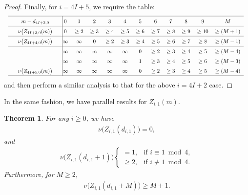 \documentclass[12pt,reqno]{amsart}
\numberwithin{equation}{section}
\theoremstyle{theorem}
\newtheorem{theorem}{Theorem}
\theoremstyle{definition}
\begin{document}
\begin{proof}
	Finally, for $i=4I+5$, we require the table:
	\begin{align*}
		\renewcommand\arraystretch{1.5}
		\scalebox{0.8}{%
			\begin{tabular*}{1.25\textwidth}{p{0pt}cp{0pt}|@{\extracolsep{\fill}}ccccccccccc}
				\hline
				& $m-d_{4I+3,0}$ && $0$ & $1$ & $2$ & $3$ & $4$ & $5$ & $6$ & $7$ & $8$ & $9$ & $M$\\
				\hline
				& $\nu\big(Z_{4I+3,0}(m)\big)$ && $0$ & $\ge 2$ & $\ge 3$ & $\ge 4$ & $\ge 5$ & $\ge 6$ & $\ge 7$ & $\ge 8$ & $\ge 9$ & $\ge 10$ & $\ge (M+1)$\\
				\hline
				& $\nu\big(Z_{4I+4,0}(m)\big)$ && $\infty$ & $\infty$ & $0$ & $\ge 2$ & $\ge 3$ & $\ge 4$ & $\ge 5$ & $\ge 6$ & $\ge 7$ & $\ge 8$ & $\ge (M-1)$\\
				\hline
				&  && $\infty$ & $\infty$ & $\infty$ & $\infty$ & $\infty$ & $0$ & $\ge 2$ & $\ge 3$ & $\ge 4$ & $\ge 5$ & $\ge (M-4)$\\
				&  && $\infty$ & $\infty$ & $\infty$ & $\infty$ & $\infty$ & $1$ & $\ge 3$ & $\ge 4$ & $\ge 5$ & $\ge 6$ & $\ge (M-3)$\\
				& $\nu\big(Z_{4I+5,0}(m)\big)$ && $\infty$ & $\infty$ & $\infty$ & $\infty$ & $\infty$ & $0$ & $\ge 2$ & $\ge 3$ & $\ge 4$ & $\ge 5$ & $\ge (M-4)$\\
				\hline
			\end{tabular*}
		}
	\end{align*}
	and then perform a similar analysis to that for the above $i=4I+2$ case.
\end{proof}

In the same fashion, we have parallel results for $Z_{i,1}(m)$.

\begin{theorem}\label{th:2-adic-Z-i-1}
	For any $i\ge 0$, we have
	\begin{align*} %
		\nu\big(Z_{i,1}(d_{i,1})\big) = 0,
	\end{align*}
	and
	\begin{align*} %
		\nu\big(Z_{i,1}(d_{i,1}+1)\big) \begin{cases}
			= 1, & \text{if $i\equiv 1 \bmod{4}$},\\
			\ge 2, & \text{if $i\not\equiv 1 \bmod{4}$}.
		\end{cases}
	\end{align*}
	Furthermore, for $M\ge 2$,
	\begin{align*} %
		\nu\big(Z_{i,1}(d_{i,1}+M)\big) \ge M+1.
	\end{align*}
\end{theorem}
\end{document}
